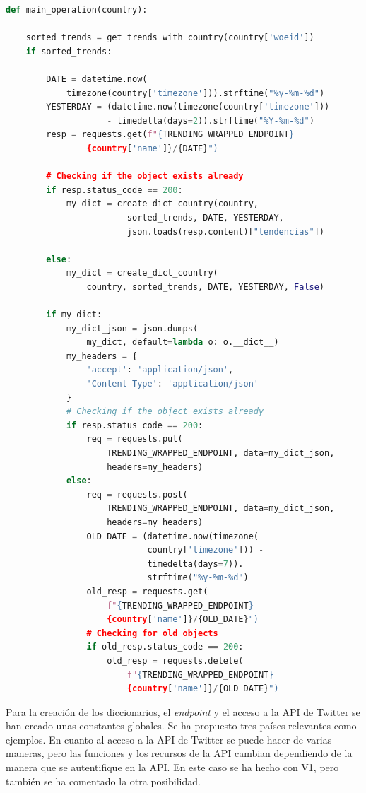 \begin{lstlisting}[caption=Operación principal,          label={lst:listing-python},language=Python]
def main_operation(country):

    sorted_trends = get_trends_with_country(country['woeid'])
    if sorted_trends:

        DATE = datetime.now(
            timezone(country['timezone'])).strftime("%y-%m-%d")
        YESTERDAY = (datetime.now(timezone(country['timezone']))
                    - timedelta(days=2)).strftime("%Y-%m-%d")
        resp = requests.get(f"{TRENDING_WRAPPED_ENDPOINT}
                {country['name']}/{DATE}")

        # Checking if the object exists already
        if resp.status_code == 200:
            my_dict = create_dict_country(country,
                        sorted_trends, DATE, YESTERDAY,
                        json.loads(resp.content)["tendencias"])

        else:
            my_dict = create_dict_country(
                country, sorted_trends, DATE, YESTERDAY, False)

        if my_dict:
            my_dict_json = json.dumps(
                my_dict, default=lambda o: o.__dict__)
            my_headers = {
                'accept': 'application/json',
                'Content-Type': 'application/json'
            }
            # Checking if the object exists already
            if resp.status_code == 200:
                req = requests.put(
                    TRENDING_WRAPPED_ENDPOINT, data=my_dict_json,
                    headers=my_headers)
            else:
                req = requests.post(
                    TRENDING_WRAPPED_ENDPOINT, data=my_dict_json,
                    headers=my_headers)
                OLD_DATE = (datetime.now(timezone(
                            country['timezone'])) -
                            timedelta(days=7)).
                            strftime("%y-%m-%d")
                old_resp = requests.get(
                    f"{TRENDING_WRAPPED_ENDPOINT}
                    {country['name']}/{OLD_DATE}")
                # Checking for old objects
                if old_resp.status_code == 200:
                    old_resp = requests.delete(
                        f"{TRENDING_WRAPPED_ENDPOINT}
                        {country['name']}/{OLD_DATE}")
\end{lstlisting}

Para la creación de los diccionarios, el \textit{endpoint} y el acceso a la API de Twitter se han creado unas constantes globales. Se ha propuesto tres países relevantes como ejemplos. En cuanto al acceso a la API de Twitter se puede hacer de varias maneras, pero las funciones y los recursos de la API cambian dependiendo de la manera que se autentifique en la API. En este caso se ha hecho con V1, pero también se ha comentado la otra posibilidad.

